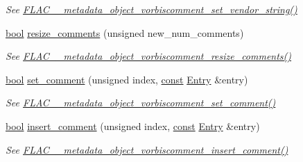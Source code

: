\begin{DoxyCompactItemize}
\begin{DoxyCompactList}\small\item\em See \hyperlink{group__flac__metadata__object_gabfc6277c08a86329efd19572695b57e6}{F\+L\+A\+C\+\_\+\+\_\+metadata\+\_\+object\+\_\+vorbiscomment\+\_\+set\+\_\+vendor\+\_\+string()} \end{DoxyCompactList}\item 
\hyperlink{mac_2config_2i386_2lib-src_2libsoxr_2soxr-config_8h_abb452686968e48b67397da5f97445f5b}{bool} \hyperlink{class_f_l_a_c_1_1_metadata_1_1_vorbis_comment_a64795c2fc4a098e753f576e85e62c3c8}{resize\+\_\+comments} (unsigned new\+\_\+num\+\_\+comments)
\begin{DoxyCompactList}\small\item\em See \hyperlink{group__flac__metadata__object_ga264611f0af9b5e09d083c1ca5495f1c4}{F\+L\+A\+C\+\_\+\+\_\+metadata\+\_\+object\+\_\+vorbiscomment\+\_\+resize\+\_\+comments()} \end{DoxyCompactList}\item 
\hyperlink{mac_2config_2i386_2lib-src_2libsoxr_2soxr-config_8h_abb452686968e48b67397da5f97445f5b}{bool} \hyperlink{class_f_l_a_c_1_1_metadata_1_1_vorbis_comment_ac75ecd354178786318c5c3af1919d949}{set\+\_\+comment} (unsigned index, \hyperlink{getopt1_8c_a2c212835823e3c54a8ab6d95c652660e}{const} \hyperlink{class_f_l_a_c_1_1_metadata_1_1_vorbis_comment_1_1_entry}{Entry} \&entry)
\begin{DoxyCompactList}\small\item\em See \hyperlink{group__flac__metadata__object_gadf034b2c385e7932c6be2d724a0deae3}{F\+L\+A\+C\+\_\+\+\_\+metadata\+\_\+object\+\_\+vorbiscomment\+\_\+set\+\_\+comment()} \end{DoxyCompactList}\item 
\hyperlink{mac_2config_2i386_2lib-src_2libsoxr_2soxr-config_8h_abb452686968e48b67397da5f97445f5b}{bool} \hyperlink{class_f_l_a_c_1_1_metadata_1_1_vorbis_comment_ad2aabf071235c0f00e580828e9c93f58}{insert\+\_\+comment} (unsigned index, \hyperlink{getopt1_8c_a2c212835823e3c54a8ab6d95c652660e}{const} \hyperlink{class_f_l_a_c_1_1_metadata_1_1_vorbis_comment_1_1_entry}{Entry} \&entry)
\begin{DoxyCompactList}\small\item\em See \hyperlink{group__flac__metadata__object_ga0c23f59f465f302b35a2d3ab1eae07e7}{F\+L\+A\+C\+\_\+\+\_\+metadata\+\_\+object\+\_\+vorbiscomment\+\_\+insert\+\_\+comment()} \end{DoxyCompactList}\item 

\end{DoxyCompactItemize}
